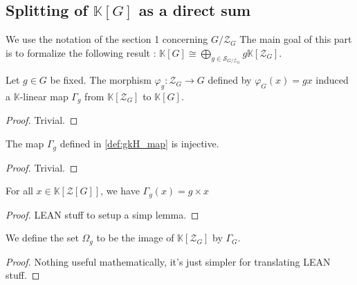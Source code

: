 \subsection{Splitting of $\mathbb{K}[G]$ as a direct sum}

We use the notation of the section 1 concerning $G/\mathcal{Z}_G$
The main goal of this part is to formalize the following result :
$\mathbb{K}[G] \cong \bigoplus\limits_{g\in \mathcal{S}_{G/\mathcal{Z}_G} } g \mathbb{K}[\mathcal{Z}_G]$.

\begin{definition}
    \label{def:gkH_map}
    \uses{}
    \leanok
    Let $g\in G$ be fixed. The morphism $\varphi_g : \mathcal{Z}_G\rightarrow G$ defined by
    $\varphi_G(x)=gx$ induced a $\mathbb{K}$-linear map $\Gamma_g$ from $\mathbb{K}[\mathcal{Z}_G]$ to $\mathbb{K}[G]$.
    \begin{proof}    
        \leanok
        Trivial.
    \end{proof}
\end{definition}

\begin{proposition}
    \label{prop:gkH_map_Injective}
    \leanok
    The map $\Gamma_g$ defined in \ref{def:gkH_map} is injective.
\end{proposition}
\begin{proof}
    \leanok
    Trivial.
\end{proof}

\begin{proposition}
    \label{prop:gkH_map_eq}
    \leanok
    For all $x\in\mathbb{K}[\mathcal{Z}[G]]$, we have $\Gamma_g(x)=g\times x$
\end{proposition}
\begin{proof}
    \leanok
    LEAN stuff to setup a simp lemma.
\end{proof}

\begin{definition}
    \label{def:gkH_set}
    \leanok
    We define the set $\Omega_g$ to be the image of $\mathbb{K}[\mathcal{Z}_G]$
    by $\Gamma_G$.
    \begin{proof}    
        \leanok
        Nothing useful mathematically, it's just simpler for translating LEAN stuff.
    \end{proof}
\end{definition}

